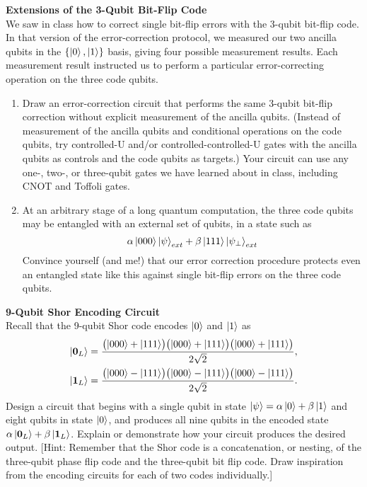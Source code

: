 \documentclass[12pt,letterpaper,boxed,cm]{hmcpset}
\begin{document}
\begin{problem}[3)]
    \textbf{Extensions of the 3-Qubit Bit-Flip Code}\\
    We saw in class how to correct single bit-flip errors with the 3-qubit bit-flip code.  In that version of the error-correction protocol, we measured our two ancilla qubits in the $\{\ket{0},\ket{1}\}$ basis, giving four possible measurement results.  Each measurement result instructed us to perform a particular error-correcting operation on the three code qubits.
    \begin{enumerate}[label=(\alph*)]
        \item Draw an error-correction circuit that performs the same 3-qubit bit-flip correction without explicit measurement of the ancilla qubits.  (Instead of measurement of the ancilla qubits and conditional operations on the code qubits, try controlled-U and/or controlled-controlled-U gates with the ancilla qubits as controls and the code qubits as targets.)  Your circuit can use any one-, two-, or three-qubit gates we have learned about in class, including CNOT and Toffoli gates.
        \item At an arbitrary stage of a long quantum computation, the three code qubits may be entangled with an external set of qubits, in a state such as 
        \[
            \alpha\ket{000}\ket{\psi}_{ext} + \beta\ket{111}\ket{\psi_{\perp}}_{ext}
        \] 
        Convince yourself (and me!) that our error correction procedure protects even an entangled state like this against single bit-flip errors on the three code qubits.
    \end{enumerate}
\end{problem}

\begin{solution}
    \vfill
\end{solution}
\newpage

\begin{problem}[4)]
    \textbf{9-Qubit Shor Encoding Circuit}\\
    Recall that the 9-qubit Shor code encodes $\ket{0}$ and $\ket{1}$ as 
    \begin{align*} 
        \ket{\mathbf{0}_L} &= \frac{\bigl(\ket{000}+\ket{111}\bigr)\bigl(\ket{000}+\ket{111}\bigr)\bigl(\ket{000}+\ket{111}\bigr)}{2\sqrt{2}}, \\
        \ket{\mathbf{1}_L} &= \frac{\bigl(\ket{000}-\ket{111}\bigr)\bigl(\ket{000}-\ket{111}\bigr)\bigl(\ket{000}-\ket{111}\bigr)}{2\sqrt{2}}. 
    \end{align*}
    Design a circuit that begins with a single qubit in state $\ket{\psi} = \alpha\ket{0} + \beta\ket{1}$ and eight qubits in state $\ket{0}$, and produces all nine qubits in the encoded state $\alpha\ket{\mathbf{0}_L} + \beta\ket{\mathbf{1}_L}$.  Explain or demonstrate how your circuit produces the desired output.  [Hint:  Remember that the Shor code is a concatenation, or nesting, of the three-qubit phase flip code and the three-qubit bit flip code.  Draw inspiration from the encoding circuits for each of two codes individually.]
\end{problem}

\begin{solution}
    \vfill
\end{solution}
\end{document}
